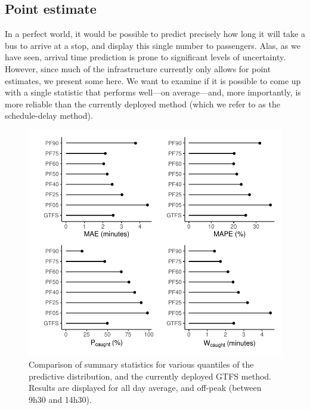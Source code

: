 \subsection{Point estimate}
\label{sec:etas-point}

In a perfect world, it would be possible to predict precisely how long it will take a bus to arrive at a stop, and display this single number to passengers. Alas, as we have seen, arrival time prediction is prone to significant levels of uncertainty. However, since much of the infrastructure currently only allows for point estimates, we present some here. We want to examine if it is possible to come up with a single statistic that performs well---on average---and, more importantly, is more reliable than the currently deployed method (which we refer to as the schedule-delay method).





\begin{knitrout}\small
{}\color{fgcolor}\begin{figure}

{\centering \includegraphics[width=.7\textwidth]{figure/eta_overall_results-1} 

}

\caption[Comparison of summary statistics for various quantiles of the predictive distribution, and the currently deployed GTFS method]{Comparison of summary statistics for various quantiles of the predictive distribution, and the currently deployed GTFS method. Results are displayed for all day average, and off-peak (between 9h30 and 14h30).}\label{fig:eta_overall_results}
\end{figure}


\end{knitrout}



